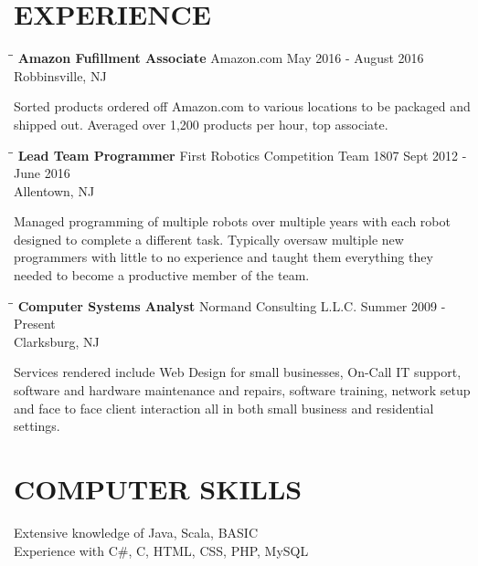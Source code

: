 \documentclass{res}
\begin{document}
\begin{resume}
\section{EXPERIENCE}
   \vspace{-0.1in}	
   \begin{tabbing}
   \hspace{2.3in}\= \hspace{2.6in}\= \kill %
    {\bf Amazon Fufillment Associate} \>Amazon.com    \>May 2016 - August 2016\\
                             \>Robbinsville, NJ
   \end{tabbing}\vspace{-20pt}      %
    Sorted products ordered off Amazon.com to various locations to be packaged and shipped out. Averaged over 1,200 products per hour, top associate.
   \begin{tabbing}
   \hspace{2.3in}\= \hspace{2.6in}\= \kill %
    {\bf Lead Team Programmer} \>First Robotics Competition Team 1807 \>  Sept 2012 - June 2016 \\
                          \>Allentown, NJ
   \end{tabbing}\vspace{-20pt}
    Managed programming of multiple robots over multiple years with each robot designed to complete a different task. Typically oversaw multiple new programmers with little to no experience
     and taught  them everything they needed to become a productive member of the team.  \begin{tabbing}%
   \hspace{2.3in}\= \hspace{2.6in}\= \kill %
   {\bf Computer Systems Analyst}  \>Normand Consulting L.L.C. \> Summer 2009 - Present\\
                          \>Clarksburg, NJ
   \end{tabbing}\vspace{-20pt}
    Services rendered include Web Design for small businesses, On-Call IT support, software and hardware maintenance and repairs, software training, network setup and face to face client interaction all in both
    small business and residential settings.


\section{COMPUTER SKILLS}          
    Extensive knowledge of Java, Scala, BASIC  \\ 
    Experience with C\#, C, HTML, CSS, PHP, MySQL        
            

\end{resume}
\end{document}
